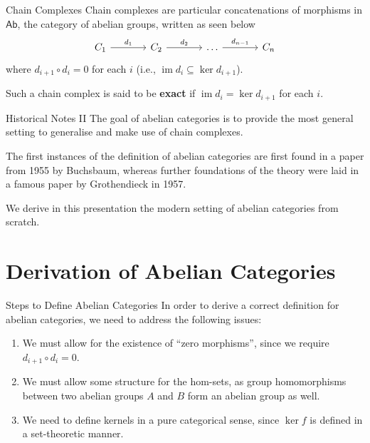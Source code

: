 \documentclass{beamer}
\DeclareMathOperator{\im}{im}
\newcommand{\cat}[1]{\mathsf{#1}}
\begin{document}
\begin{frame}{Chain Complexes}
    Chain complexes are particular concatenations of morphisms in $\cat{Ab}$, the
    category of abelian groups, written as seen below
    \[\begin{tikzcd}[sep=large, ampersand replacement=\&]
        {C_1} \& {C_2} \& \ldots \& {C_n}
        \arrow["{d_1}", from=1-1, to=1-2]
        \arrow["{d_2}", from=1-2, to=1-3]
        \arrow["{d_{n-1}}", from=1-3, to=1-4]
    \end{tikzcd}\]
    where $d_{i+1} \circ d_i = 0$ for each $i$ (i.e., $\im d_i \subseteq \ker d_{i+1}$). \smallskip

    Such a chain complex is said to be \textbf{exact} if
    $\im d_i = \ker d_{i+1}$ for each $i$.
\end{frame}

\begin{frame}{Historical Notes II}
    The goal of abelian categories is to provide the most general setting to
    generalise and make use of chain complexes. \medskip
    
    The first instances of the definition of abelian
    categories are first found in a paper from 1955 by Buchsbaum, whereas further
    foundations of the theory were laid in a famous paper by
    Grothendieck in 1957. \medskip

    We derive in this presentation the modern setting of
    abelian categories from scratch.
\end{frame}


\section{Derivation of Abelian Categories}

\begin{frame}{Steps to Define Abelian Categories}
    In order to derive a correct definition for
    abelian categories, we need to address the following issues:
    \begin{enumerate}
        \item We must allow for the existence of ``zero morphisms'',
            since we require $d_{i+1} \circ d_i = 0$.
        \item We must allow some structure for the hom-sets, as
            group homomorphisms between two abelian groups $A$ and
            $B$ form an abelian group as well.
        \item We need to define kernels in a pure categorical sense,
            since $\ker f$ is defined in a set-theoretic manner. 
    \end{enumerate}
\end{frame}
\end{document}
